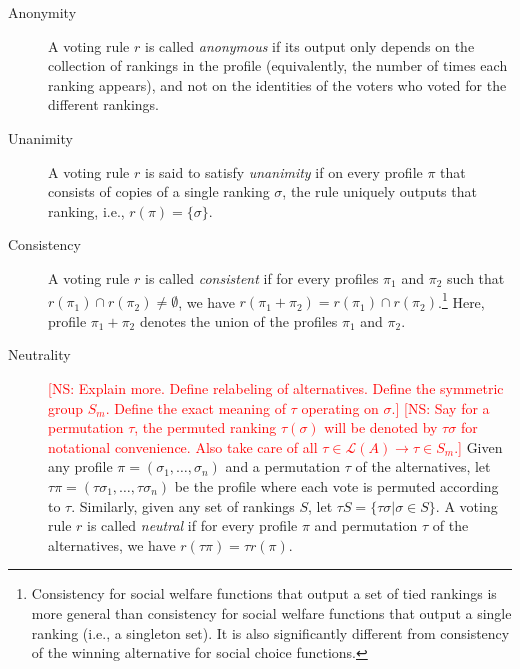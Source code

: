 \documentclass[prodmode,acmec]{ec-acmsmall}
\newcommand{\calL}{{\mathcal{L}}}
\newcommand{\rank}{{\calL(A)}}
\newcommand{\kibitz}[2]{\ifnum\Comments=1\textcolor{#1}{#2}\fi}
\newcommand{\ns}[1]{\kibitz{red} {[NS: #1]}}
\begin{document}
\begin{description}
\item[Anonymity] A voting rule $r$ is called \emph{anonymous} if its output only depends on the collection of rankings in the profile (equivalently, the number of times each ranking appears), and not on the identities of the voters who voted for the different rankings. \\ %

\item[Unanimity] A voting rule $r$ is said to satisfy \emph{unanimity} if on every profile $\pi$ that consists of copies of a single ranking $\sigma$, the rule uniquely outputs that ranking, i.e., $r(\pi) = \{\sigma\}$.\\ %

\item[Consistency] A voting rule $r$ is called \emph{consistent} if for every profiles $\pi_1$ and $\pi_2$ such that $r(\pi_1) \cap r(\pi_2) \neq \emptyset$, we have $r(\pi_1+\pi_2) = r(\pi_1) \cap r(\pi_2)$.\footnote{Consistency for social welfare functions that output a set of tied rankings is more general than consistency for social welfare functions that output a single ranking (i.e., a singleton set). It is also significantly different from consistency of the winning alternative for social choice functions.} Here, profile $\pi_1+\pi_2$ denotes the union of the profiles $\pi_1$ and $\pi_2$. \\ %

\item[Neutrality] \ns{Explain more. Define relabeling of alternatives. Define the symmetric group $S_m$. Define the exact meaning of $\tau$ operating on $\sigma$.} \ns{Say for a permutation $\tau$, the permuted ranking $\tau(\sigma)$ will be denoted by $\tau \sigma$ for notational convenience. Also take care of all $\tau \in \rank \rightarrow \tau \in S_m$.}
Given any profile $\pi = (\sigma_1,\ldots,\sigma_n)$ and a permutation $\tau$ of the alternatives, let $\tau \pi = (\tau \sigma_1,\ldots,\tau \sigma_n)$ be the profile where each vote is permuted according to $\tau$. Similarly, given any set of rankings $S$, let $\tau S = \{\tau \sigma | \sigma \in S\}$. A voting rule $r$ is called \emph{neutral} if for every profile $\pi$ and permutation $\tau$ of the alternatives, we have $r(\tau \pi) = \tau r(\pi)$. \\


\end{description}
\end{document}

